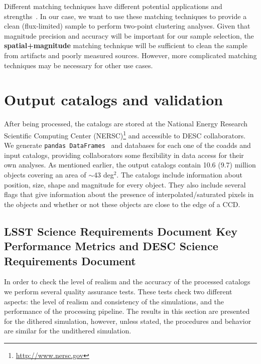 \documentclass[\docopts]{\docclass}
\begin{document}
Different matching techniques have different potential applications and strengths~\citep{doi:10.1146/annurev-statistics-010814-020231}. In our case, we want to use these matching techniques to provide a clean (flux-limited) sample to perform two-point clustering analyses. Given that magnitude precision and accuracy will be important for our sample selection, the \textbf{spatial+magnitude} matching technique will be sufficient to clean the sample from artifacts and poorly measured sources. However, more complicated matching techniques may be necessary for other use cases.
 
 
\section{Output catalogs and validation}
\label{sec:catalogs}
After being processed, the catalogs are stored at the National Energy Research Scientific Computing Center (NERSC)\footnote{\url{http://www.nersc.gov}} and accessible to DESC collaborators. We generate \texttt{pandas
DataFrames}~\citep{mckinney-proc-scipy-2010} and databases for each one of the coadds and input catalogs, providing collaborators some flexibility in data access for their own analyses. As mentioned earlier, the output catalogs contain 10.6 (9.7) million objects covering an area
of $\sim$43 deg$^{2}$. The catalogs include information about position, size, shape and magnitude for every object. They also include several flags that give information about the presence of interpolated/saturated pixels in the objects and whether or not these objects are close to the edge of a CCD.

\subsection{LSST Science Requirements Document Key Performance Metrics and DESC Science Requirements Document}

In order to check the level of realism and the accuracy of the processed catalogs we perform several quality assurance tests. These tests check two different aspects: the level of realism and consistency of the simulations, and the performance of the processing pipeline. The results in this section are presented for the dithered simulation, however, unless stated, the procedures and behavior are similar for the undithered simulation.
\end{document}
